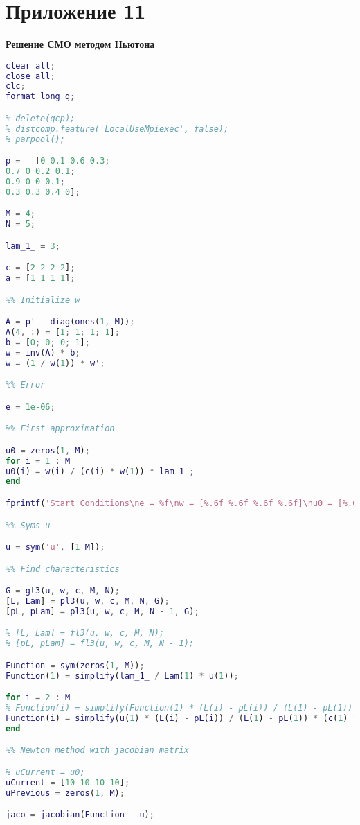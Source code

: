 \section*{Приложение 11} \label{p3:11}
\textbf{Решение СМО методом Ньютона}
\begin{lstlisting}[language={matlab}, caption={Решение СМО методом Ньютона}, label={lst:0}, basicstyle={\footnotesize\ttfamily}, breaklines={true}]
clear all;
close all; 
clc;
format long g;

% delete(gcp);
% distcomp.feature('LocalUseMpiexec', false);
% parpool();

p =   [0 0.1 0.6 0.3;
0.7 0 0.2 0.1;
0.9 0 0 0.1;
0.3 0.3 0.4 0];

M = 4;
N = 5;

lam_1_ = 3;

c = [2 2 2 2];
a = [1 1 1 1];

%% Initialize w

A = p' - diag(ones(1, M));
A(4, :) = [1; 1; 1; 1];
b = [0; 0; 0; 1];
w = inv(A) * b;
w = (1 / w(1)) * w';

%% Error

e = 1e-06;

%% First approximation

u0 = zeros(1, M);
for i = 1 : M
u0(i) = w(i) / (c(i) * w(1)) * lam_1_;
end

fprintf('Start Conditions\ne = %f\nw = [%.6f %.6f %.6f %.6f]\nu0 = [%.6f %.6f %.6f %.6f]\n\n', e, w, u0);

%% Syms u

u = sym('u', [1 M]);

%% Find characteristics

G = gl3(u, w, c, M, N);
[L, Lam] = pl3(u, w, c, M, N, G);
[pL, pLam] = pl3(u, w, c, M, N - 1, G);

% [L, Lam] = fl3(u, w, c, M, N);
% [pL, pLam] = fl3(u, w, c, M, N - 1);

Function = sym(zeros(1, M));
Function(1) = simplify(lam_1_ / Lam(1) * u(1));

for i = 2 : M
% Function(i) = simplify(Function(1) * (L(i) - pL(i)) / (L(1) - pL(1)) * (c(1) * a(1)) / (c(i) * a(i)));
Function(i) = simplify(u(1) * (L(i) - pL(i)) / (L(1) - pL(1)) * (c(1) * a(1)) / (c(i) * a(i)));
end

%% Newton method with jacobian matrix

% uCurrent = u0;
uCurrent = [10 10 10 10];
uPrevious = zeros(1, M);

jaco = jacobian(Function - u);


\end{lstlisting}
